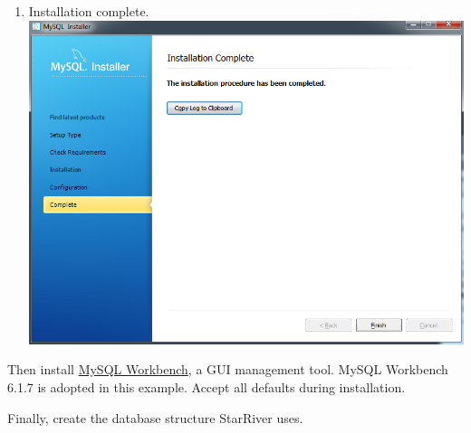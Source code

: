 \begin{enumerate}
\item
  Installation complete. \includegraphics{img/mysql_11.png}
\end{enumerate}

Then install \href{http://dev.mysql.com/downloads/workbench/}{MySQL
Workbench}, a GUI management tool. MySQL Workbench 6.1.7 is adopted in
this example. Accept all defaults during installation.

Finally, create the database structure StarRiver uses.

